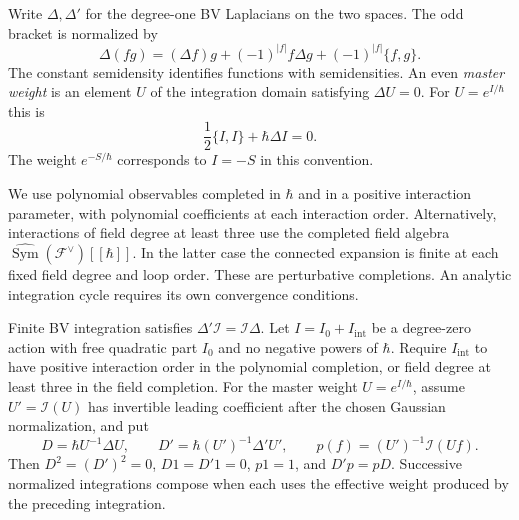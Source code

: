 Write $\Delta,\Delta'$ for the degree-one BV Laplacians on the two
spaces. The odd bracket is normalized by
\begin{equation}\label{mht:eq:quantum-product-identity}
 \Delta(fg)=(\Delta f)g+(-1)^{|f|}f\Delta g
                              +(-1)^{|f|}\{f,g\}.
\end{equation}
The constant semidensity identifies functions with semidensities.
An even \emph{master weight} is an element $U$ of the integration
domain satisfying $\Delta U=0$. For $U=e^{I/\hbar}$ this is
\[
 \frac12\{I,I\}+\hbar\Delta I=0.
\]
The weight $e^{-S/\hbar}$ corresponds to $I=-S$ in this convention.

We use polynomial observables completed in $\hbar$ and in a positive
interaction parameter, with polynomial coefficients at each
interaction order. Alternatively, interactions of field degree at
least three use the completed field algebra
$\widehat{\operatorname{Sym}}(\mathcal F^\vee)[[\hbar]]$.
In the latter case the connected expansion is finite at each fixed
field degree and loop order. These are perturbative completions.
An analytic integration cycle requires its own convergence conditions.

\begin{proposition}\label{mht:prop:normalized-bv-pushforward}
Finite BV integration satisfies $\Delta'\mathcal I=\mathcal I\Delta$.
Let $I=I_0+I_{\mathrm{int}}$ be a degree-zero action with free
quadratic part $I_0$ and no negative powers of $\hbar$.
Require $I_{\mathrm{int}}$ to have positive interaction order in the
polynomial completion, or field degree at least three in the field
completion. For the master weight $U=e^{I/\hbar}$, assume
$U'=\mathcal I(U)$ has invertible leading coefficient after the
chosen Gaussian normalization, and put
\begin{equation}\label{mht:eq:normalized-bv-map}
 D=\hbar U^{-1}\Delta U,\qquad
 D'=\hbar(U')^{-1}\Delta'U',\qquad
 p(f)=(U')^{-1}\mathcal I(Uf).
\end{equation}
Then $D^2=(D')^2=0$, $D1=D'1=0$, $p1=1$, and $D'p=pD$.
Successive normalized integrations compose when each uses the
effective weight produced by the preceding integration.
\end{proposition}

